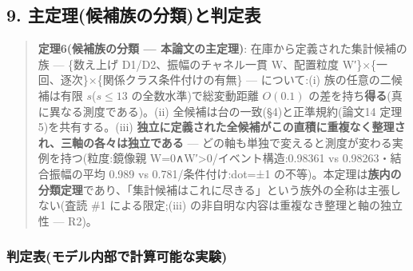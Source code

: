 \documentclass[
]{ltjsarticle}
\begin{document}
\subsection{9.
主定理(候補族の分類)と判定表}\label{ux4e3bux5b9aux7406ux5019ux88dcux65cfux306eux5206ux985eux3068ux5224ux5b9aux8868}

\begin{quote}
\textbf{定理6(候補族の分類 --- 本論文の主定理)}:
在庫から定義された集計候補の族 --- \{数え上げ D1/D2、振幅のチャネル一貫
W、配置粒度 W′\}×\{一回、逐次\}×\{関係クラス条件付けの有無\} ---
について:(i) 族の任意の二候補は有限 \(s\)(\(s\le13\)
の全数水準)で総変動距離 \(O(0.1)\)
の差を持ち\textbf{得る}(真に異なる測度である)。(ii)
全候補は台の一致(§4)と正準規約(論文14 定理5)を共有する。(iii)
\textbf{独立に定義された全候補がこの直積に重複なく整理され、三軸の各々は独立である}
--- どの軸も単独で変えると測度が変わる実例を持つ(粒度:鏡像親
W=0∧W′\textgreater0/イベント構造:0.98361 vs 0.98263・結合振幅の平均
0.989 vs 0.781/条件付け:dot=±1
の不等)。本定理は\textbf{族内の分類定理}であり、「集計候補はこれに尽きる」という族外の全称は主張しない(査読
\#1 による限定;(iii) の非自明な内容は重複なき整理と軸の独立性 --- R2)。
\end{quote}

\subsubsection{判定表(モデル内部で計算可能な実験)}\label{ux5224ux5b9aux8868ux30e2ux30c7ux30ebux5185ux90e8ux3067ux8a08ux7b97ux53efux80fdux306aux5b9fux9a13}
\end{document}
